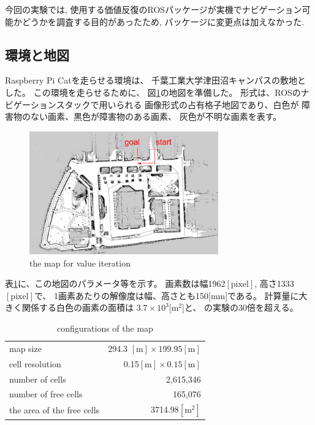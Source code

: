 \documentclass{jarticle}
\begin{document}
今回の実験では, 使用する価値反復のROSパッケージが実機でナビゲーション可能かどうかを調査する目的があったため,
パッケージに変更点は加えなかった.

\subsection{環境と地図}

Raspberry Pi Catを走らせる環境は、
千葉工業大学津田沼キャンパスの敷地とした。
この環境を走らせるために、
図\ref{fig:tsudanuma}の地図を準備した。
形式は、ROSのナビゲーションスタックで用いられる
画像形式の占有格子地図であり、白色が
障害物のない画素、黒色が障害物のある画素、
灰色が不明な画素を表す。

\begin{figure}[htb]
  \centering
   \includegraphics[height=53mm]{./figs/tsudanuma.png}
   \caption{the map for value iteration}
	\label{fig:tsudanuma}
\end{figure}

表\ref{table:map}に、この地図のパラメータ等を示す。
画素数は幅1962$\mathrm{[pixel]}$, 
高さ1333$\mathrm{[pixel]}$で、
1画素あたりの解像度は幅、高さとも150[mm]である。
計算量に大きく関係する白色の画素の面積は
$3.7\times 10^3$[m$^2$]と、\cite{上田rsj2021}
の実験の30倍を超える。

\begin{table}[hbt]
  \caption{conﬁgurations of the map}
	\label{table:map}
  \centering
	\begin{small}
  \begin{tabular}{l|r}
    \hline
    map size & 294.3 $\mathrm{[m]}\times 199.95\mathrm{[m]}$\\
    cell resolution &  0.15$\mathrm{[m]}\times 0.15\mathrm{[m]}$ \\
		number of cells & 2,615,346\\
    number of free cells & 165,076\\
		the area of the free cells & 3714.98$\mathrm{[m^2]}$\\
    \hline
  \end{tabular}
	\end{small}
\end{table}
\end{document}
